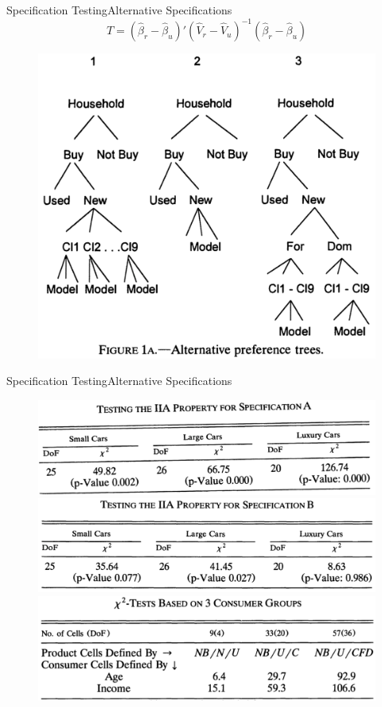 \documentclass{beamer}
\begin{document}
\begin{frame}{Specification Testing}{Alternative Specifications}
	\begin{equation}
		T=\left(\hat{\beta}_r-\hat{\beta}_u\right)'\left(\hat{V}_r-\hat{V}_u\right)^{-1}\left(\hat{\beta}_r-\hat{\beta}_u\right)
	\end{equation}
	\begin{figure}[h]
		\centering
		\includegraphics[scale=0.35]{figure_1a.png}
	\end{figure}
\end{frame}
\begin{frame}{Specification Testing}{Alternative Specifications}
	\begin{figure}[h]
		\centering
		\includegraphics[scale=0.45]{table_c1(2).png}
		\includegraphics[scale=0.45]{table_c2(2).png}
		\includegraphics[scale=0.45]{table_c3(2).png}
	\end{figure}
\end{frame}
\end{document}
